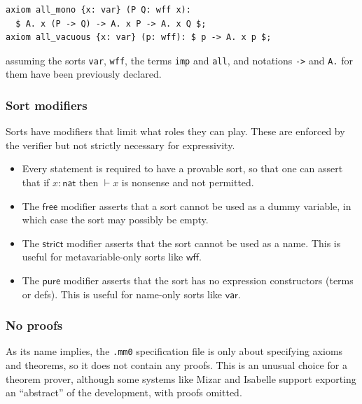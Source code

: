 \documentclass[runningheads]{llncs}
\begin{document}
\begin{verbatim}
axiom all_mono {x: var} (P Q: wff x):
  $ A. x (P -> Q) -> A. x P -> A. x Q $;
axiom all_vacuous {x: var} (p: wff): $ p -> A. x p $;
\end{verbatim}
assuming the sorts \texttt{var}, \texttt{wff}, the terms \texttt{imp} and \texttt{all}, and notations \texttt{->} and \texttt{A.} for them have been previously declared.

\subsubsection{Sort modifiers}\label{sec:modifier}
Sorts have modifiers that limit what roles they can play. These are enforced by the verifier but not strictly necessary for expressivity.
\begin{itemize}
  \item Every statement is required to have a \textsf{provable} sort, so that one can assert that if $x:\mathsf{nat}$ then $\vdash x$ is nonsense and not permitted.
  \item The $\mathsf{free}$ modifier asserts that a sort cannot be used as a dummy variable, in which case the sort may possibly be empty.
  \item The $\mathsf{strict}$ modifier asserts that the sort cannot be used as a name. This is useful for metavariable-only sorts like $\mathsf{wff}$.
  \item The $\mathsf{pure}$ modifier asserts that the sort has no expression constructors (terms or defs). This is useful for name-only sorts like $\mathsf{var}$.
\end{itemize}

\subsubsection{No proofs}
As its name implies, the \texttt{.mm0} specification file is only about specifying axioms and theorems, so it does not contain any proofs. This is an unusual choice for a theorem prover, although some systems like Mizar and Isabelle support exporting an ``abstract'' of the development, with proofs omitted.
\end{document}
